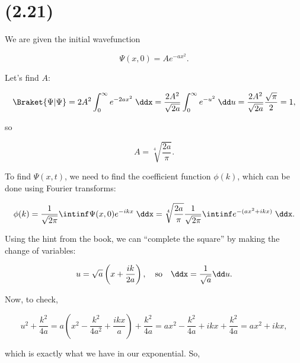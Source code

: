 \section{(2.21)}

We are given the initial wavefunction

\begin{equation}
    \Psi(x,0) = Ae^{-ax^2}.
\end{equation}


\begin{parts}
    

\item Let's find $A$:

\begin{equation*}
    \Braket{\Psi | \Psi} = 2A^2 \int_0^{\infty} e^{-2ax^2}\;\ddx = \frac{2A^2}{\sqrt{2a}} \int_0^{\infty}e^{-u^2}\;\dd u = \frac{2A^2}{\sqrt{2a}} \frac{\sqrt{\pi}}{2} = 1,
\end{equation*}

so

\begin{equation*}
    \boxed{A = \sqrt[4]{\frac{2a}{\pi}}.}
\end{equation*}


\item To find $\Psi(x,t)$, we need to find the coefficient function $\phi(k)$, which can be done using Fourier transforms:

\begin{equation*}
    \phi(k) = \frac{1}{\sqrt{2\pi}} \intinf \Psi(x,0) e^{-ikx} \;\ddx = \sqrt[4]{\frac{2a}{\pi}}\frac{1}{\sqrt{2\pi}} \intinf e^{-(ax^2 + ikx)}\;\ddx.
\end{equation*}

Using the hint from the book, we can ``complete the square'' by making the change of variables:

\begin{equation*}
    u = \sqrt{a} \left( x + \frac{ik}{2a} \right), \quad \mathrm{so} \quad \ddx = \frac{1}{\sqrt{a}}\dd u.
\end{equation*}

Now, to check,

\begin{equation*}
    u^2 + \frac{k^2}{4a} = a\left( x^2 - \frac{k^2}{4a^2} + \frac{ikx}{a} \right) + \frac{k^2}{4a} = ax^2 - \frac{k^2}{4a} + ikx + \frac{k^2}{4a} = ax^2+ikx,
\end{equation*}

which is exactly what we have in our exponential. So,


\end{parts}
